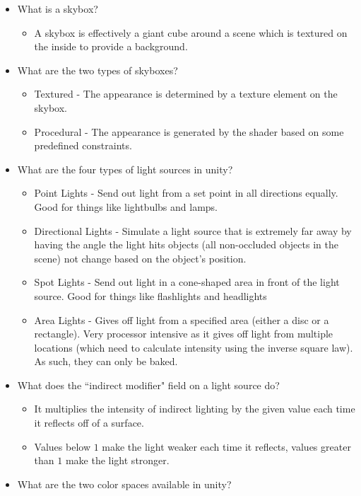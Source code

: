 \documentclass{article}
\begin{document}
\begin{itemize}
    \item What is a skybox?
    \begin{itemize}
        \item A skybox is effectively a giant cube around a scene which is textured on the inside to provide a background.
    \end{itemize}
    \item What are the two types of skyboxes?
    \begin{itemize}
        \item Textured - The appearance is determined by a texture element on the skybox.
        \item Procedural - The appearance is generated by the shader based on some predefined constraints.
    \end{itemize}
    \item What are the four types of light sources in unity?
    \begin{itemize}
        \item Point Lights - Send out light from a set point in all directions equally. Good for things like lightbulbs and lamps.
        \item Directional Lights - Simulate a light source that is extremely far away by having the angle the light hits objects (all non-occluded objects in the scene) not change based on the object's position.
        \item Spot Lights - Send out light in a cone-shaped area in front of the light source. Good for things like flashlights and headlights
        \item Area Lights - Gives off light from a specified area (either a disc or a rectangle). Very processor intensive as it gives off light from multiple locations (which need to calculate intensity using the inverse square law). As such, they can only be baked.
    \end{itemize}
    \item What does the ``indirect modifier" field on a light source do?
    \begin{itemize}
        \item It multiplies the intensity of indirect lighting by the given value each time it reflects off of a surface.
        \item Values below $1$ make the light weaker each time it reflects, values greater than $1$ make the light stronger.
    \end{itemize}
    \item What are the two color spaces available in unity?

\end{itemize}
\end{document}
